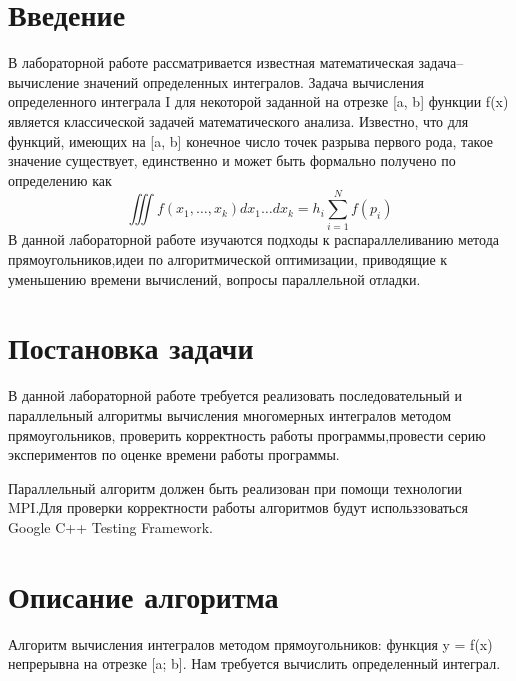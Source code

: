 \documentclass{report}
\begin{document}
\setcounter{page}{2}

\tableofcontents
\newpage

\section*{Введение}
\par В лабораторной работе рассматривается известная математическая задача–вычисление значений определенных интегралов.
Задача вычисления определенного интеграла I для некоторой заданной на отрезке [a, b] функции f(x) является классической задачей математического анализа. Известно, что для функций, имеющих на [a, b] конечное число точек разрыва первого рода, такое значение существует, единственно и может быть формально получено по определению как\\
\begin{equation}\iiint{f(x_1,\dots,x_k) dx_1 \dots dx_k} = h_i\sum_{i=1}^{N}{f(p_{i})} \end{equation}
В данной лабораторной работе изучаются подходы к распараллеливанию метода прямоугольников,идеи по алгоритмической оптимизации, приводящие к уменьшению времени вычислений, вопросы параллельной отладки.
\newpage

\section*{Постановка задачи}
\par В данной лабораторной работе требуется реализовать последовательный и параллельный алгоритмы вычисления многомерных интегралов методом прямоугольников, проверить корректность работы программы,провести серию экспериментов по оценке времени работы программы.

\par Параллельный алгоритм должен быть реализован при помощи технологии MPI.Для проверки корректности работы алгоритмов будут использзоваться Google C++ Testing Framework.
\newpage

\section*{Описание алгоритма}
\par {}
Алгоритм вычисления интегралов методом прямоугольников:
 функция y = f(x) непрерывна на отрезке [a; b]. Нам требуется вычислить определенный интеграл.
\end{document}

